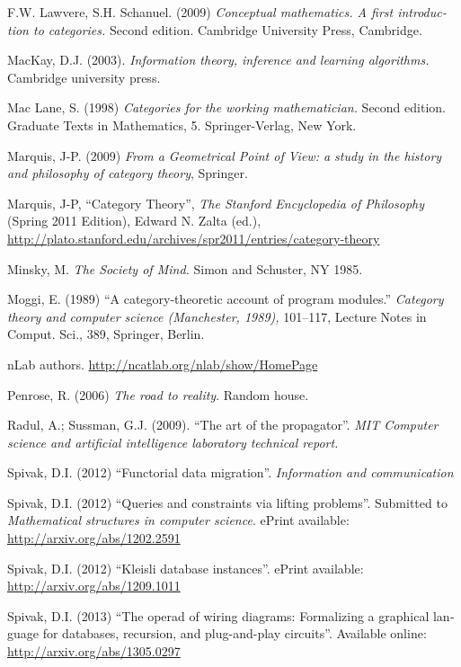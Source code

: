 \documentclass[a4paper]{book}
\theoremstyle{myth}
\begin{document}
\begin{english}
\begin{thebibliography}{SGWB}
 F.W. Lawvere, S.H. Schanuel. (2009) {\em Conceptual mathematics. 
A first introduction to categories.} Second edition. Cambridge University Press, Cambridge.

 MacKay, D.J. (2003). {\em Information theory, inference and learning algorithms.} Cambridge university press.

 Mac Lane, S. (1998) {\em Categories for the working mathematician.} Second edition. Graduate Texts in Mathematics, 5. Springer-Verlag, New York.

 Marquis, J-P. (2009) {\em From a Geometrical Point of View: a study in the history and philosophy of category theory}, Springer.

 Marquis, J-P, “Category Theory”, {\em The Stanford Encyclopedia of Philosophy} (Spring 2011 Edition), Edward N. Zalta (ed.), \url{http://plato.stanford.edu/archives/spr2011/entries/category-theory}

 Minsky, M. {\em The Society of Mind.}  Simon and Schuster, NY 1985.

 Moggi, E. (1989) “A category-theoretic account of program modules.” {\em Category theory and computer science (Manchester, 1989),} 101–117, Lecture Notes in Comput. Sci., 389, Springer, Berlin. 

 nLab authors.  \url{http://ncatlab.org/nlab/show/HomePage}

 Penrose, R. (2006) {\em The road to reality}. Random house.

 Radul, A.; Sussman, G.J. (2009). “The art of the propagator”. {\em MIT Computer science and artificial intelligence laboratory technical report.}

 Spivak, D.I. (2012) “Functorial data migration”. {\em Information and communication} 

 Spivak, D.I. (2012) “Queries and constraints via lifting problems”. Submitted to {\em Mathematical structures in computer science}. ePrint available: \url{http://arxiv.org/abs/1202.2591}

 Spivak, D.I. (2012) “Kleisli database instances”. ePrint available: \url{http://arxiv.org/abs/1209.1011}

 Spivak, D.I. (2013) “The operad of wiring diagrams: Formalizing a graphical language for databases, recursion, and plug-and-play circuits”. Available online: \url{http://arxiv.org/abs/1305.0297}


\end{thebibliography}
\end{english}
\end{document}
